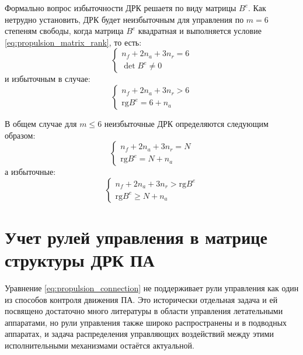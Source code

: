 Формально вопрос избыточности ДРК решаетя по виду матрицы $B^e$.
Как нетрудно установить, ДРК будет неизбыточным для управления по $m=6$ степеням свободы, когда матрица $B^e$ квадратная и выполняется условие \ref{eq:propulsion_matrix_rank}, то есть:
\begin{equation}
    \left\{
    \begin{array}{ll}
    n_f + 2n_a + 3n_r = 6  \\
    \det B^e \neq 0 
    \end{array}
    \right.
\end{equation}
\noindent и избыточным в случае:
\begin{equation}
    \left\{
    \begin{array}{ll}
    n_f + 2n_a + 3n_r > 6  \\
    \text{rg}B^e = 6 + n_a
    \end{array}
    \right.
\end{equation}

В общем случае для $m \leq 6$ неизбыточные ДРК определяются следующим образом:
\begin{equation}
    \left\{
    \begin{array}{ll}
    n_f + 2n_a + 3n_r = N  \\
    \text{rg}B^e = N + n_a
    \end{array}
    \right.
\end{equation}
\noindent а избыточные:
\begin{equation}
    \left\{
    \begin{array}{ll}
    n_f + 2n_a + 3n_r > \text{rg}B^e  \\
    \text{rg}B^e \geq N + n_a
    \end{array}
    \right.
\end{equation}

\section{Учет рулей управления в матрице структуры ДРК ПА}
Уравнение \ref{eq:propulsion_connection} не поддерживает рули управления как один из способов контроля движения ПА.
Это исторически отдельная задача и ей посвящено достаточно много литературы в области управления летательными аппаратами, но рули управления также широко распространены и в подводных аппаратах, и задача распределения управляющих воздействий между этими исполнительными механизмами остаётся актуальной.


